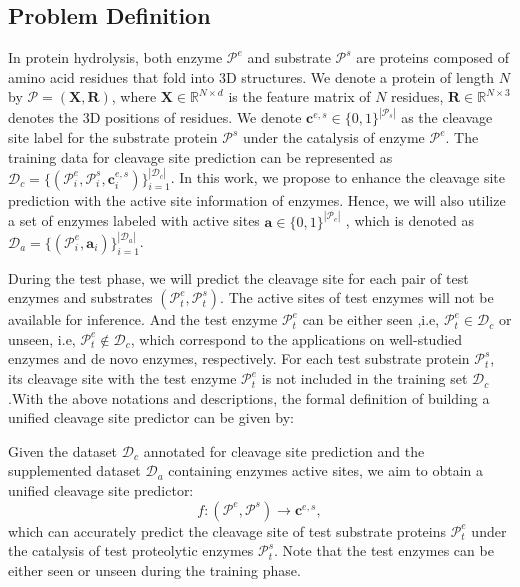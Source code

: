 

\subsection{Problem Definition}

In protein hydrolysis, both enzyme $\mathcal{P}^e$ and substrate $\mathcal{P}^s$ are proteins composed of amino acid residues that fold into 3D structures. We denote a protein of length $N$ by $\mathcal{P}=(\mathbf{X}, \mathbf{R})$, where $\mathbf{X}\in\mathbb{R}^{N \times d}$ is the feature matrix of $N$ residues, $\mathbf{R} \in \mathbb{R}^{N \times 3}$ denotes the 3D positions of residues. We denote $\mathbf{c}^{e,s} \in \{0,1\}^{|\mathcal{P}_s|}$ as the cleavage site label for the substrate protein $\mathcal{P}^s$ under the catalysis of enzyme $\mathcal{P}^e$. The training data for cleavage site prediction can be represented as $\mathcal{D}_c=\{(\mathcal{P}^e_i, \mathcal{P}^s_i, \mathbf{c}^{e,s}_i)\}^{|\mathcal{D}_c|}_{i=1}$. 
In this work, we propose to enhance the cleavage site prediction with the active site information of enzymes. Hence, we will also utilize a set of enzymes labeled with active sites $\mathbf{a} \in \{0,1\}^{|\mathcal{P}_e|}$ , which is denoted as $\mathcal{D}_a=\{(\mathcal{P}^e_i, \mathbf{a}_i)\}_{i=1}^{|\mathcal{D}_a|}$. 

During the test phase, we will predict the cleavage site for each pair of test enzymes and substrates $(\mathcal{P}^e_t, \mathcal{P}^s_t)$. The active sites of test enzymes will not be available for inference. And the test enzyme $\mathcal{P}^e_t$ can be either seen ,i.e, $\mathcal{P}^e_t \in \mathcal{D}_c$  or unseen, i.e, $\mathcal{P}^e_t \notin \mathcal{D}_c$, which correspond to the applications on well-studied enzymes and de novo enzymes, respectively. For each test substrate protein $\mathcal{P}^s_t$, its cleavage site with the test enzyme $\mathcal{P}^e_t$ is not included in the training set $\mathcal{D}_c$.With the above notations and descriptions, the formal definition of building a unified cleavage site predictor can be given by:
\begin{problem}
    Given the dataset $\mathcal{D}_c$ annotated  for  cleavage site prediction and the supplemented dataset $\mathcal{D}_a$ containing enzymes active sites, we aim to obtain a unified cleavage site predictor:
    \begin{equation}
        f: (\mathcal{P}^e, \mathcal{P}^s) \rightarrow \mathbf{c}^{e,s},
    \end{equation}
    which can accurately predict the cleavage site of test substrate proteins $\mathcal{P}^e_t$ under the catalysis of test proteolytic enzymes $\mathcal{P}^s_t$. Note that the test enzymes can be either seen or unseen during the training phase. 
\end{problem}

